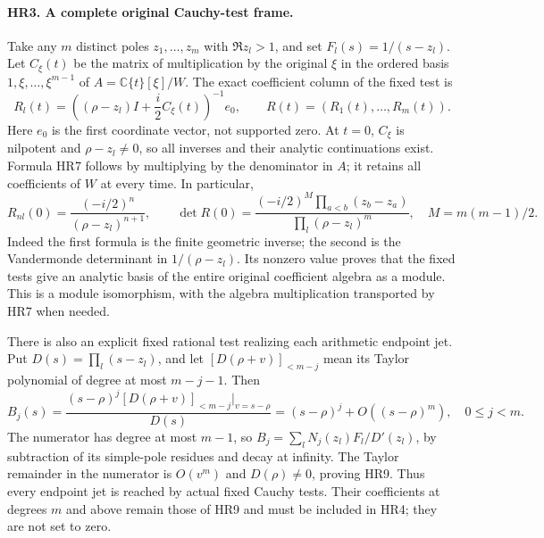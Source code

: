 \paragraph{HR3. A complete original Cauchy-test frame.}
Take any $m$ distinct poles $z_1,\ldots,z_m$ with $\Re z_l>1$,
and set $F_l(s)=1/(s-z_l)$. Let $C_\xi(t)$ be the matrix of
multiplication by the original $\xi$ in the ordered basis
$1,\xi,\ldots,\xi^{m-1}$ of $A=\mathbb C\{t\}[\xi]/W$.
The exact coefficient column of the fixed test is
\[
 R_l(t)=\left((\rho-z_l)I+\frac i2 C_\xi(t)\right)^{-1}e_0,
 \qquad R(t)=(R_1(t),\ldots,R_m(t)).
 \tag{HR7}
\]
Here $e_0$ is the first coordinate vector, not supported zero.
At $t=0$, $C_\xi$ is nilpotent and $\rho-z_l\ne0$, so all
inverses and their analytic continuations exist. Formula HR7
follows by multiplying by the denominator in $A$; it retains all
coefficients of $W$ at every time. In particular,
\[
 R_{nl}(0)=\frac{(-i/2)^n}{(\rho-z_l)^{n+1}},\qquad
 \det R(0)=\frac{(-i/2)^M\prod_{a<b}(z_b-z_a)}
                       {\prod_l(\rho-z_l)^m},\quad
 M=m(m-1)/2.
 \tag{HR8}
\]
Indeed the first formula is the finite geometric inverse; the
second is the Vandermonde determinant in $1/(\rho-z_l)$.
Its nonzero value proves that the fixed tests give an analytic
basis of the entire original coefficient algebra as a module.
This is a module isomorphism, with the algebra multiplication
transported by HR7 when needed.

There is also an explicit fixed rational test realizing each
arithmetic endpoint jet. Put $D(s)=\prod_l(s-z_l)$, and let
$[D(\rho+v)]_{<m-j}$ mean its Taylor polynomial of degree at most
$m-j-1$. Then
\[
 B_j(s)=\frac{(s-\rho)^j[D(\rho+v)]_{<m-j}|_{v=s-\rho}}{D(s)}
       =(s-\rho)^j+O((s-\rho)^m),\quad 0\le j<m.
 \tag{HR9}
\]
The numerator has degree at most $m-1$, so
$B_j=\sum_l N_j(z_l)F_l/D'(z_l)$, by subtraction of its
simple-pole residues and decay at infinity. The Taylor remainder
in the numerator is $O(v^m)$ and $D(\rho)\ne0$, proving HR9.
Thus every endpoint jet is reached by actual fixed Cauchy tests.
Their coefficients at degrees $m$ and above remain those of HR9
and must be included in HR4; they are not set to zero.

